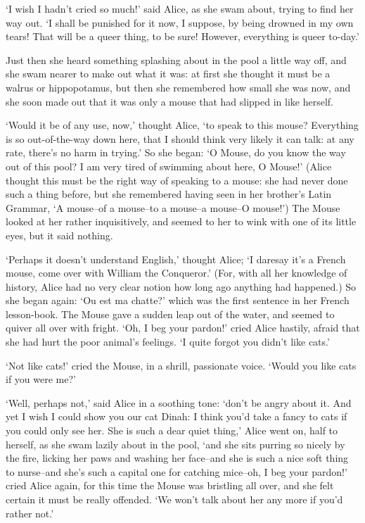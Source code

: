 \documentclass[statementpaper,twoside,openany]{memoir}
\begin{document}
`I wish I hadn't cried so much!' said Alice, as she swam about, trying to find her way out. `I shall be punished for it now, I suppose, by being drowned in my own tears! That will be a queer thing, to be sure! However, everything is queer to-day.'

Just then she heard something splashing about in the pool a little way off, and she swam nearer to make out what it was: at first she thought it must be a walrus or hippopotamus, but then she remembered how small she was now, and she soon made out that it was only a mouse that had slipped in like herself.

`Would it be of any use, now,' thought Alice, `to speak to this mouse? Everything is so out-of-the-way down here, that I should think very likely it can talk: at any rate, there's no harm in trying.' So she began: `O Mouse, do you know the way out of this pool? I am very tired of swimming about here, O Mouse!' (Alice thought this must be the right way of speaking to a mouse: she had never done such a thing before, but she remembered having seen in her brother's Latin Grammar, `A mouse--of a mouse--to a mouse--a mouse--O mouse!') The Mouse looked at her rather inquisitively, and seemed to her to wink with one of its little eyes, but it said nothing.

`Perhaps it doesn't understand English,' thought Alice; `I daresay it's a French mouse, come over with William the Conqueror.' (For, with all her knowledge of history, Alice had no very clear notion how long ago anything had happened.) So she began again: `Ou est ma chatte?' which was the first sentence in her French lesson-book. The Mouse gave a sudden leap out of the water, and seemed to quiver all over with fright. `Oh, I beg your pardon!' cried Alice hastily, afraid that she had hurt the poor animal's feelings. `I quite forgot you didn't like cats.'

`Not like cats!' cried the Mouse, in a shrill, passionate voice. `Would you like cats if you were me?'

`Well, perhaps not,' said Alice in a soothing tone: `don't be angry about it. And yet I wish I could show you our cat Dinah: I think you'd take a fancy to cats if you could only see her. She is such a dear quiet thing,' Alice went on, half to herself, as she swam lazily about in the pool, `and she sits purring so nicely by the fire, licking her paws and washing her face--and she is such a nice soft thing to nurse--and she's such a capital one for catching mice--oh, I beg your pardon!' cried Alice again, for this time the Mouse was bristling all over, and she felt certain it must be really offended. `We won't talk about her any more if you'd rather not.'
\end{document}
